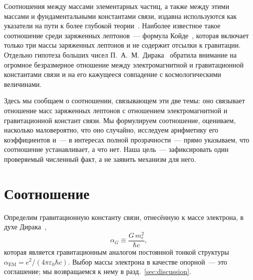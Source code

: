 \documentclass[aps,prd,twocolumn,amsmath,amssymb,floatfix,nofootinbib]{revtex4-2}
\begin{document}
Соотношения между массами элементарных частиц, а также между этими массами
и фундаментальными константами связи, издавна используются как указатели на
пути к более глубокой теории~\cite{koide1983,dirac1938,wesson1980}. Наиболее
известное такое соотношение среди заряженных лептонов~--- формула
Койде~\cite{koide1983}, которая включает только три массы заряженных
лептонов и не содержит отсылки к гравитации. Отдельно гипотеза больших чисел
П.~А.~М.~Дирака~\cite{dirac1938} обратила внимание на огромное безразмерное
отношение между электромагнитной и гравитационной константами связи и на его
кажущееся совпадение с космологическими величинами.

Здесь мы сообщаем о соотношении, связывающем эти две темы: оно связывает
отношение масс заряженных лептонов с отношением электромагнитной и
гравитационной констант связи. Мы формулируем соотношение, оцениваем,
насколько маловероятно, что оно случайно, исследуем арифметику его
коэффициентов и~--- в интересах полной прозрачности~--- прямо указываем, что
соотношение устанавливает, а что нет. Наша цель~--- зафиксировать один
проверяемый численный факт, а не заявить механизм для него.

\section{Соотношение}

Определим гравитационную константу связи, отнесённую к массе электрона, в
духе Дирака~\cite{dirac1938},
\begin{equation}
\alpha_G \equiv \frac{G\,m_e^2}{\hbar c},
\label{eq:alphaG}
\end{equation}
которая является гравитационным аналогом постоянной тонкой структуры
$\alpha_{\mathrm{EM}} = e^2/(4\pi\varepsilon_0\hbar c)$. Выбор массы
электрона в качестве опорной~--- это соглашение; мы возвращаемся к нему в
разд.~\ref{sec:discussion}.
\end{document}
